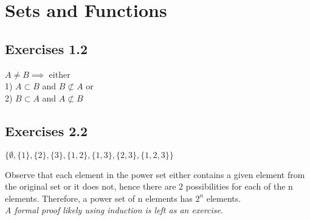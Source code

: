 \section{Sets and Functions}
\subsection{Exercises 1.2}

\begin{solution}
  $A \neq B \implies$ either \\
  1) $A \subset B$ and $B \not\subset A$ or\\
  2) $B \subset A$ and $A \not\subset B$\\
\end{solution}

\setcounter{question}{0}
\subsection{Exercises 2.2}

\begin{solution}
  $\{\emptyset, \{1\}, \{2\}, \{3\}, \{1,2\}, \{1,3\}, \{2,3\}, \{1,2,3\}\}$
\end{solution}

\begin{solution}
  Observe that each element in the power set either contains a given element from the original set or it does not, hence there are 2 possibilities for each of the n elements. Therefore, a power set of n elements has $2^n$ elements.\\\textit{A formal proof likely using induction is left as an exercise.}
\end{solution}

